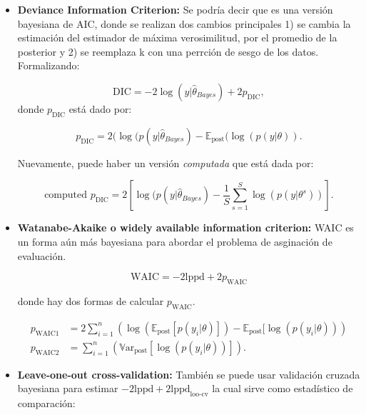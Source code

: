 \begin{itemize}
    \item \textbf{Deviance Information Criterion:} Se podría decir que es una versión bayesiana de AIC, donde se realizan dos cambios principales 1) se cambia la estimación del estimador de máxima verosimilitud, por el promedio de la posterior y 2) se reemplaza k con una perrción de sesgo de los datos. Formalizando:
    
    \begin{equation}
        \text{DIC} = -2 \log(y|\hat{\theta}_{Bayes}) + 2p_{\text{DIC}},
    \end{equation}
    donde $p_{\text{DIC}}$ está dado por:
    
    \begin{equation}
        p_{\text{DIC}} = 2(\log(p(y|\hat{\theta}_{Bayes})- \mathbb{E}_{\text{post}}(\log(p(y|\theta)).
    \end{equation}
    
    Nuevamente, puede haber un versión \emph{computada} que está dada por:
    
    \begin{equation}
        \text{computed }p_{\text{DIC}} = 2[\log(p(y|\hat{\theta}_{Bayes})- \frac{1}{S}\sum_{s=1}^S \log (p(y|\theta^s))].
    \end{equation}
    \item \textbf{Watanabe-Akaike o widely available information criterion:} WAIC es un forma aún más bayesiana para abordar el problema de asginación de evaluación. 
    
    \begin{equation}
        \text{WAIC} = -2 \text{lppd} + 2 p_{\text{WAIC}}
    \end{equation}
    
    donde hay dos formas de calcular $p_{\text{WAIC}}$.
    
    \begin{align}
    p_{\text{WAIC}1} &= 2 \sum_{i= 1}^n \left( \log(\mathbb{E}_{\text{post}}[p(y_i|\theta)]) - \mathbb{E}_{\text{post}}[\log (p(y_i|\theta))\right)\\
    p_{\text{WAIC}2} &= \sum_{i= 1}^n \left( \mathbb{V}\text{ar}_{\text{post}}[\log(p(y_i|\theta))]\right).
    \end{align}
    \item \textbf{Leave-one-out cross-validation:} También se puede usar validación cruzada bayesiana para estimar $-2\text{lppd} + 2\text{lppd}_{\text{loo-cv}}$ la cual sirve como estadístico de comparación:
    

\end{itemize}
